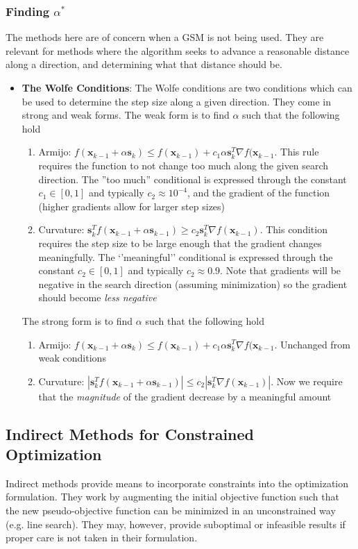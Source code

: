 \documentclass[11pt]{article}
\newcommand{\Item}[1]{\item \textbf{#1}:}
\newcommand{\boldx}{\mathbf{x}}
\begin{document}
\subsubsection{Finding $\alpha^*$}
The methods here are of concern when a GSM is not being used. They are relevant for methods where the algorithm seeks to advance a reasonable distance along a direction, and determining what that distance should be.
\begin{itemize}
\Item{The Wolfe Conditions} The Wolfe conditions are two conditions which can be used to determine the step size along a given direction. They come in strong and weak forms. The weak form is to find $\alpha$ such that the following hold
	\begin{enumerate}
	\item Armijo: $\boxed{f(\boldx_{k-1}+\alpha\mathbf{s}_k)\leq f(\boldx_{k-1})+c_1\alpha\mathbf{s}_k^T\nabla f(\boldx_{k-1}}$. This rule requires the function to not change too much along the given search direction. The ''too much'' conditional is expressed through the constant $c_1\in[0,1]$ and typically $c_2\approx 10^{-4}$, and the gradient of the function (higher gradients allow for larger step sizes)
	\item Curvature: $\boxed{\mathbf{s}_k^Tf(\boldx_{k-1}+\alpha\mathbf{s}_{k-1})\geq c_2\mathbf{s}_k^T\nabla f(\boldx_{k-1})}$. This condition requires the step size to be large enough that the gradient changes meaningfully. The `'meaningful'' conditional is expressed through the constant $c_2\in[0,1]$ and typically $c_2\approx0.9$. Note that gradients will be negative in the search direction (assuming minimization) so the gradient should become \emph{less negative}
	\end{enumerate}
	
	The strong form is to find $\alpha$ such that the following hold
	\begin{enumerate}
	\item Armijo: $\boxed{f(\boldx_{k-1}+\alpha\mathbf{s}_k)\leq f(\boldx_{k-1})+c_1\alpha\mathbf{s}_k^T\nabla f(\boldx_{k-1}}$. Unchanged from weak conditions
	\item Curvature: $\boxed{|\mathbf{s}_k^Tf(\boldx_{k-1}+\alpha\mathbf{s}_{k-1})|\leq c_2|\mathbf{s}_k^T\nabla f(\boldx_{k-1})|}$. Now we require that the \emph{magnitude} of the gradient decrease by a meaningful amount 
	\end{enumerate}
\end{itemize}

\subsection{Indirect Methods for Constrained Optimization}
Indirect methods provide means to incorporate constraints into the optimization formulation. They work by augmenting the initial objective function such that the new pseudo-objective function can be minimized in an unconstrained way (e.g. line search). They may, however, provide suboptimal or infeasible results if proper care is not taken in their formulation.
\end{document}
